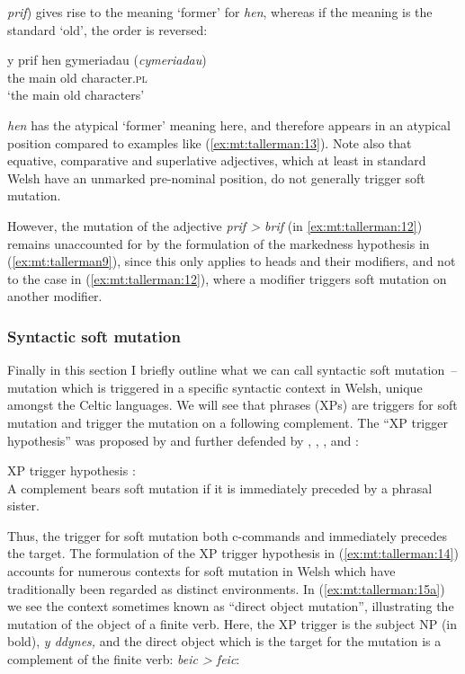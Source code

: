 \documentclass[output=paper,colorlinks,citecolor=brown]{langscibook}
\begin{document}
 {\textit{prif}}{) gives rise to the meaning ‘former’ for} {\textit{hen}}{, whereas if the meaning is the standard ‘old’, the order is reversed:}

\ea\label{ex:mt:tallerman:13}
\gll y prif hen gymeriadau    (\textit{cymeriadau})\\
the main old character.\textsc{pl}\\
\glt `the main old characters'
\z

 {\textit{hen}}{ has the atypical ‘former’ meaning here, and therefore appears in an atypical position compared to examples like (\ref{ex:mt:tallerman:13}). Note also that equative, comparative and superlative adjectives, which at least in standard Welsh have an unmarked pre-nominal position, do not generally trigger soft mutation.} 

{However, the mutation of the adjective} {\textit{prif > brif} }(in \ref{ex:mt:tallerman:12}) remains unaccounted for by the formulation of the markedness hypothesis in (\ref{ex:mt:tallerman9}), since this only applies to heads and their modifiers, and not to the case in (\ref{ex:mt:tallerman:12}), where a modifier triggers soft mutation on another modifier. 


\subsubsection{Syntactic soft mutation}


Finally in this section I briefly outline what we can call syntactic soft mutation~– mutation which is triggered in a specific syntactic context in Welsh, unique amongst the Celtic languages. We will see that phrases (XPs) are triggers for soft mutation and trigger the mutation on a following complement. The “XP trigger hypothesis” was proposed by \citet{BorsleyTallerman1996} and further defended by \citet{Borsley1999}, \citet{Tallerman2006}, \citet{Tallerman2009}, and \citet{BorsleyEtAl2007}:

\ea\label{ex:mt:tallerman:14}
XP trigger hypothesis \citep{Borsley1999}:\\
A complement bears soft mutation if it is immediately preceded by a  phrasal sister. 
\z

\noindent Thus, the trigger for soft mutation both c-commands and immediately precedes the target. The formulation of the XP trigger hypothesis in (\ref{ex:mt:tallerman:14}) accounts for numerous contexts for soft mutation in Welsh which have traditionally been regarded as distinct environments. In (\ref{ex:mt:tallerman:15a}) we see the context sometimes known as “direct object mutation”, illustrating the mutation of the object of a finite verb. Here, the XP trigger is the subject NP (in bold), \textit{y ddynes,} and the direct object which is the target for the mutation is a complement of the finite verb: \textit{beic > feic}: 
\end{document}

